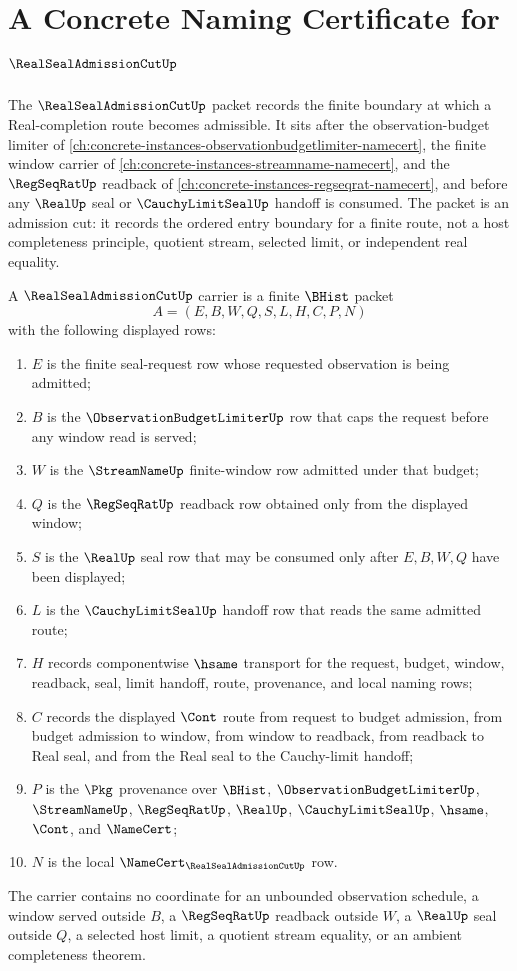 \chapter{A Concrete Naming Certificate for $\RealSealAdmissionCutUp$}
\label{ch:concrete-instances-real-seal-admission-cut-namecert}

The $\RealSealAdmissionCutUp$ packet records the finite boundary at which a Real-completion route becomes admissible. It sits after the observation-budget limiter of \autoref{ch:concrete-instances-observationbudgetlimiter-namecert}, the finite window carrier of \autoref{ch:concrete-instances-streamname-namecert}, and the $\RegSeqRatUp$ readback of \autoref{ch:concrete-instances-regseqrat-namecert}, and before any $\RealUp$ seal or $\CauchyLimitSealUp$ handoff is consumed. The packet is an admission cut: it records the ordered entry boundary for a finite route, not a host completeness principle, quotient stream, selected limit, or independent real equality.

\begin{definition}
\label{def:real-seal-admission-cut-carrier}
A $\RealSealAdmissionCutUp$ carrier is a finite $\BHist$ packet
$$
A=(E,B,W,Q,S,L,H,C,P,N)
$$
with the following displayed rows:
\begin{enumerate}
\item $E$ is the finite seal-request row whose requested observation is being admitted;
\item $B$ is the $\ObservationBudgetLimiterUp$ row that caps the request before any window read is served;
\item $W$ is the $\StreamNameUp$ finite-window row admitted under that budget;
\item $Q$ is the $\RegSeqRatUp$ readback row obtained only from the displayed window;
\item $S$ is the $\RealUp$ seal row that may be consumed only after $E,B,W,Q$ have been displayed;
\item $L$ is the $\CauchyLimitSealUp$ handoff row that reads the same admitted route;
\item $H$ records componentwise $\hsame$ transport for the request, budget, window, readback, seal, limit handoff, route, provenance, and local naming rows;
\item $C$ records the displayed $\Cont$ route from request to budget admission, from budget admission to window, from window to readback, from readback to Real seal, and from the Real seal to the Cauchy-limit handoff;
\item $P$ is the $\Pkg$ provenance over $\BHist$, $\ObservationBudgetLimiterUp$, $\StreamNameUp$, $\RegSeqRatUp$, $\RealUp$, $\CauchyLimitSealUp$, $\hsame$, $\Cont$, and $\NameCert$;
\item $N$ is the local $\NameCert_{\RealSealAdmissionCutUp}$ row.
\end{enumerate}
The carrier contains no coordinate for an unbounded observation schedule, a window served outside $B$, a $\RegSeqRatUp$ readback outside $W$, a $\RealUp$ seal outside $Q$, a selected host limit, a quotient stream equality, or an ambient completeness theorem.
\end{definition}

